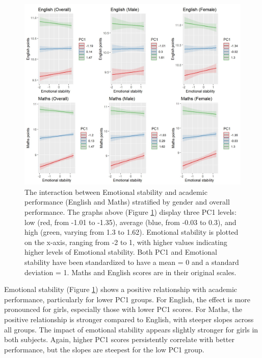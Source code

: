 \documentclass[12pt,a4paper,onecolumn]{article}
\numberwithin{equation}{section}
\begin{document}
\begin{figure}[ht] 
    \centering
    \includegraphics[width=1\linewidth]{AVE_TIPI_Emot.JPG}
    \caption{The interaction between Emotional stability and academic performance (English and Maths) stratified by gender and overall performance. The graphs above (Figure \ref{Fig7}) display three PC1 levels: low (red, from -1.01 to -1.35), average (blue, from -0.03 to 0.3), and high (green, varying from 1.3 to 1.62). Emotional stability is plotted on the x-axis, ranging from -2 to 1, with higher values indicating higher levels of Emotional stability. Both PC1 and Emotional stability have been standardized to have a mean = 0 and a standard deviation = 1. Maths and English scores are in their original scales.}
    \label{Fig7}
\end{figure}

Emotional stability (Figure \ref{Fig7}) shows a positive relationship with academic performance, particularly for lower PC1 groups. For English, the effect is more pronounced for girls, especially those with lower PC1 scores. For Maths, the positive relationship is stronger compared to English, with steeper slopes across all groups. The impact of emotional stability appears slightly stronger for girls in both subjects. Again, higher PC1 scores persistently correlate with better performance, but the slopes are steepest for the low PC1 group.
\end{document}
